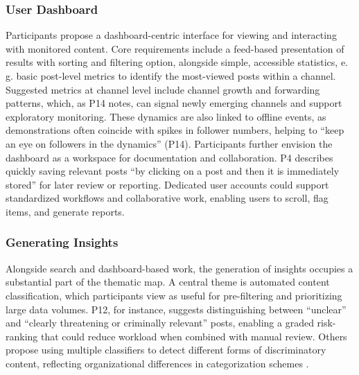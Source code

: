 \documentclass[acmsmall]{acmart}
\begin{document}
\subsubsection{User Dashboard}  
\label{sssec:dashboard}
Participants propose a dashboard-centric interface for viewing and interacting with monitored content. Core requirements include a feed-based presentation of results with sorting and filtering option, alongside simple, accessible statistics, e.\,g. basic post-level metrics to identify the most-viewed posts within a channel.
Suggested metrics at channel level include channel growth and forwarding patterns, which, as P14 notes, can signal newly emerging channels and support exploratory monitoring. These dynamics are also linked to offline events, as demonstrations often coincide with spikes in follower numbers, helping to ``keep an eye on followers in the dynamics'' (P14).
Participants further envision the dashboard as a workspace for documentation and collaboration. P4 describes quickly saving relevant posts ``by clicking on a post and then it is immediately stored'' for later review or reporting. Dedicated user accounts could support standardized workflows and collaborative work, enabling users to scroll, flag items, and generate reports.


\subsubsection{Generating Insights}
\label{sssec:generate_insights}
Alongside search and dashboard-based work, the generation of insights occupies a substantial part of the thematic map. A central theme is automated content classification, which participants view as useful for pre-filtering and prioritizing large data volumes. P12, for instance, suggests distinguishing between ``unclear'' and ``clearly threatening or criminally relevant'' posts, enabling a graded risk-ranking that could reduce workload when combined with manual review. Others propose using multiple classifiers to detect different forms of discriminatory content, reflecting organizational differences in categorization schemes \cite{baumler_harnessing_2025}.
\end{document}
